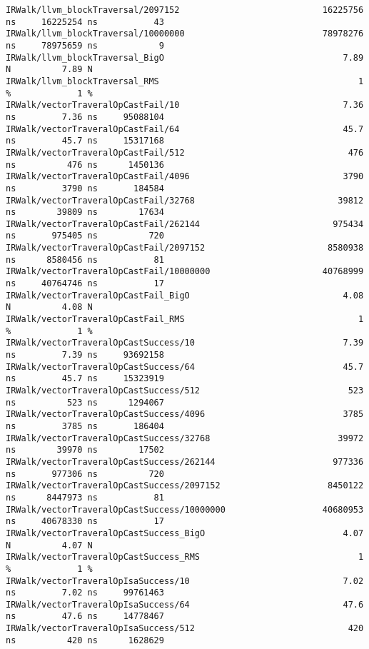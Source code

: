 \begin{code}
\begin{verbatim}
IRWalk/llvm_blockTraversal/2097152                            16225756 ns     16225254 ns           43
IRWalk/llvm_blockTraversal/10000000                           78978276 ns     78975659 ns            9
IRWalk/llvm_blockTraversal_BigO                                   7.89 N          7.89 N
IRWalk/llvm_blockTraversal_RMS                                       1 %             1 %
IRWalk/vectorTraveralOpCastFail/10                                7.36 ns         7.36 ns     95088104
IRWalk/vectorTraveralOpCastFail/64                                45.7 ns         45.7 ns     15317168
IRWalk/vectorTraveralOpCastFail/512                                476 ns          476 ns      1450136
IRWalk/vectorTraveralOpCastFail/4096                              3790 ns         3790 ns       184584
IRWalk/vectorTraveralOpCastFail/32768                            39812 ns        39809 ns        17634
IRWalk/vectorTraveralOpCastFail/262144                          975434 ns       975405 ns          720
IRWalk/vectorTraveralOpCastFail/2097152                        8580938 ns      8580456 ns           81
IRWalk/vectorTraveralOpCastFail/10000000                      40768999 ns     40764746 ns           17
IRWalk/vectorTraveralOpCastFail_BigO                              4.08 N          4.08 N
IRWalk/vectorTraveralOpCastFail_RMS                                  1 %             1 %
IRWalk/vectorTraveralOpCastSuccess/10                             7.39 ns         7.39 ns     93692158
IRWalk/vectorTraveralOpCastSuccess/64                             45.7 ns         45.7 ns     15323919
IRWalk/vectorTraveralOpCastSuccess/512                             523 ns          523 ns      1294067
IRWalk/vectorTraveralOpCastSuccess/4096                           3785 ns         3785 ns       186404
IRWalk/vectorTraveralOpCastSuccess/32768                         39972 ns        39970 ns        17502
IRWalk/vectorTraveralOpCastSuccess/262144                       977336 ns       977306 ns          720
IRWalk/vectorTraveralOpCastSuccess/2097152                     8450122 ns      8447973 ns           81
IRWalk/vectorTraveralOpCastSuccess/10000000                   40680953 ns     40678330 ns           17
IRWalk/vectorTraveralOpCastSuccess_BigO                           4.07 N          4.07 N
IRWalk/vectorTraveralOpCastSuccess_RMS                               1 %             1 %
IRWalk/vectorTraveralOpIsaSuccess/10                              7.02 ns         7.02 ns     99761463
IRWalk/vectorTraveralOpIsaSuccess/64                              47.6 ns         47.6 ns     14778467
IRWalk/vectorTraveralOpIsaSuccess/512                              420 ns          420 ns      1628629

\end{verbatim}
\end{code}
